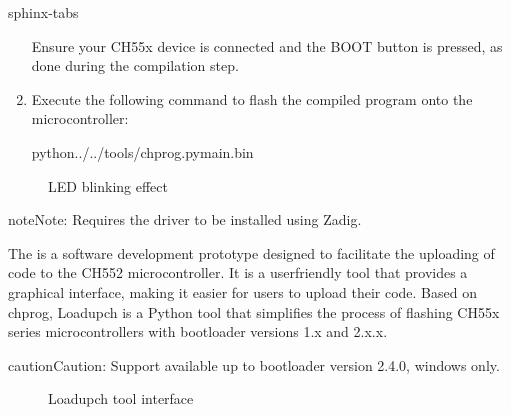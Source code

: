 \documentclass[letterpaper,10pt,english]{sphinxmanual}
\begin{document}
\begin{sphinxuseclass}{sphinx-tabs}
\begin{enumerate}
\sphinxAtStartPar
Ensure your CH55x device is connected and the BOOT button is pressed, as done during the compilation step.

\item {} 
\sphinxAtStartPar
{}

\sphinxAtStartPar
Execute the following command to flash the compiled program onto the microcontroller:

\begin{sphinxVerbatim}[commandchars=\\\{\}]
python../../tools/chprog.pymain.bin
\end{sphinxVerbatim}

\end{enumerate}

\begin{figure}[htbp]
\centering
\capstart

\noindent{}
\caption{LED blinking effect}\label{\detokenize{compile:id20}}\label{\detokenize{compile:id12}}\end{figure}

\begin{sphinxadmonition}{note}{Note:}
\sphinxAtStartPar
Requires the  driver to be installed using Zadig.
\end{sphinxadmonition}

\sphinxAtStartPar
{}

\sphinxAtStartPar
The  is a software development prototype designed to facilitate the uploading of code to the CH552 microcontroller.
It is a user\sphinxhyphen{}friendly tool that provides a graphical interface, making it easier for users to upload their code.
Based on chprog, Loadupch is a Python tool that simplifies the process of flashing CH55x series microcontrollers with bootloader versions 1.x and 2.x.x.

\begin{sphinxadmonition}{caution}{Caution:}
\sphinxAtStartPar
Support available up to bootloader version 2.4.0, windows only.
\end{sphinxadmonition}

\begin{figure}[htbp]
\centering
\capstart

\noindent{}
\caption{Loadupch tool interface}\label{\detokenize{compile:id21}}\label{\detokenize{compile:id16}}\end{figure}


\end{sphinxuseclass}
\end{document}
